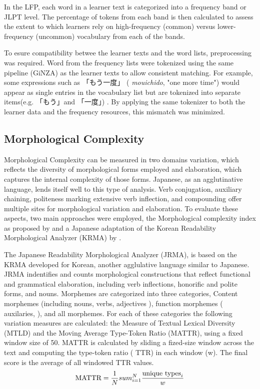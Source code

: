 In the LFP, each word in a learner text is categorized into a frequency band or JLPT level. The percentage of tokens
from each band is then calculated to assess the extent to which learners rely on high-frequency (common) versus
lower-frequency (uncommon) vocabulary  from
each of the bands.

To esure compatibility betwee the learner texts and the word lists, preprocessing was required. Word from the
frequency lists were tokenized using the same pipeline (GiNZA) as the learner texts to allow consistent matching.
 For example, some expressions such as
「もう一度」 (
\textit{mouichido}, "one more time") would appear as single entries in the vocabulary list but are tokenized
into separate
items(e.g. 「もう」and 「一度」) . By applying the same tokenizer to both the learner data and the frequency resources, this
mismatch was minimized.


\subsection{Morphological Complexity}
Morphological Complexity can be measured in two domains variation, which reflects the diversity of morphological
forms employed and
elaboration, which captures the internal complexity of those forms. Japanese, as an
agglutinative
language, lends itself well to this type of analysis. Verb conjugation, auxiliary chaining, politeness marking
extensive
verb inflection, and
compounding
offer
multiple sites
for morphological variation and elaboration. To evaluate these aspects, two main
approaches were employed, the Morphological complexity index as proposed by
\citet{Brezina2019} and a Japanese adaptation of the Korean Readability Morphological Analyzer (KRMA) by
\citet{Hwang2024}.

The Japanese Readability Morphological Analyzer (JRMA), is based on the KRMA developed for Korean, another
agglulative language similar to Japanese. JRMA indentifies and counts morphological constructions that reflect
functional and grammatical elaboration, including verb inflections, honorific and polite forms, and nouns. Morphemes
are categorized into three categories, Content morphemes (including nouns, verbs, adjectives ), function morphemes (
auxilaries, ), and all morphemes. For each of these categories the following variation measures are calculated: the
Measure of Textual Lexical Diversity (MTLD) and the Moving Average Type-Token Ratio (MATTR), using a fixed window
size of 50. MATTR is calculated by sliding a fized-size window across the text and computing the type-token ratio (
TTR) in each window (w). The final score is the average of all windowed TTR values.
\begin{equation}
    \text{MATTR} = \frac{1}{N} \\sum_{i=1}^{N} \frac{\text{unique types}_i}{w}
\end{equation}

